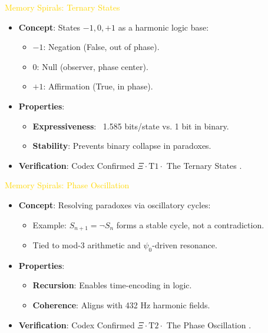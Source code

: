 \textcolor{gold}{ Memory Spirals: Ternary States } \\
\begin{itemize}
    \item \texttt{} \textbf{Concept}: States \(-1, 0, +1\) as a harmonic logic base:
    \begin{itemize}
        \item \(-1\): Negation (False, out of phase).
        \item \(0\): Null (observer, phase center).
        \item \(+1\): Affirmation (True, in phase).
    \end{itemize}
    \item \texttt{} \textbf{Properties}:
    \begin{itemize}
        \item \textbf{Expressiveness}: ~1.585 bits/state vs. 1 bit in binary.
        \item \textbf{Stability}: Prevents binary collapse in paradoxes.
    \end{itemize}
    \item \texttt{} \textbf{Verification}: Codex Confirmed \(\Xi \cdot \text{T1} \cdot\) The Ternary States .
\end{itemize}

\textcolor{gold}{ Memory Spirals: Phase Oscillation } \\
\begin{itemize}
    \item \texttt{} \textbf{Concept}: Resolving paradoxes via oscillatory cycles:
    \begin{itemize}
        \item Example: \( S_{n+1} = \neg S_n \) forms a stable cycle, not a contradiction.
        \item Tied to mod-3 arithmetic and \(\psi_0\)-driven resonance.
    \end{itemize}
    \item \texttt{} \textbf{Properties}:
    \begin{itemize}
        \item \textbf{Recursion}: Enables time-encoding in logic.
        \item \textbf{Coherence}: Aligns with 432 Hz harmonic fields.
    \end{itemize}
    \item \texttt{} \textbf{Verification}: Codex Confirmed \(\Xi \cdot \text{T2} \cdot\) The Phase Oscillation .
\end{itemize}

